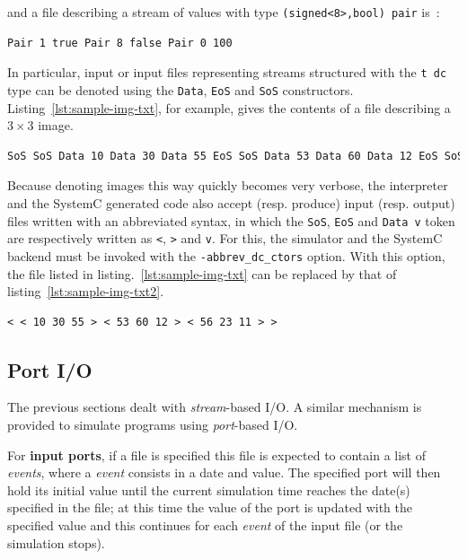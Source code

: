 \noindent
and  a file describing a stream of values with type \verb|(signed<8>,bool) pair| is~:

\begin{verbatim}
Pair 1 true Pair 8 false Pair 0 100
\end{verbatim}

In particular, input or input files representing streams structured with the \verb|t dc| type can be
denoted using the \verb|Data|, \verb|EoS| and \verb|SoS|
constructors. Listing~\ref{lst:sample-img-txt}, for example, gives the contents of a file describing
a $3 \times 3$ image.

\begin{lstlisting}[language=make,basicstyle=\footnotesize,frame=single,caption={A text input file
    describing a 3x3 image},label={lst:sample-img-txt}]
SoS SoS Data 10 Data 30 Data 55 EoS SoS Data 53 Data 60 Data 12 EoS SoS Data 56 Data 23 Data 11 EoS EoS
\end{lstlisting}

Because denoting images this way quickly becomes very verbose, the interpreter and the SystemC
generated code also accept (resp. produce) input (resp. output) files written with an
abbreviated syntax, in which the \verb|SoS|, \verb|EoS| and \verb|Data v| token are respectively
written as \verb|<|, \verb|>| and \verb|v|. For this, the simulator and the SystemC backend
must be invoked with the \verb|-abbrev_dc_ctors| option. With this option, the file listed in
listing.~\ref{lst:sample-img-txt} can be replaced by that of listing~\ref{lst:sample-img-txt2}.

\begin{lstlisting}[language=make,basicstyle=\footnotesize,frame=single,caption={A text input file
    describing a 3x3 image (abbreviated syntax)},label={lst:sample-img-txt2}]
< < 10 30 55 > < 53 60 12 > < 56 23 11 > >
\end{lstlisting}

\subsection{Port I/O}
\label{sec:asynchronous-io}

The previous sections dealt with \emph{stream}-based I/O. A similar mechanism is provided to
simulate programs using \emph{port}-based I/O. 

\medskip
For \textbf{input ports}, if a file is specified this file is expected to contain a list of \emph{events},
where a \emph{event} consists in a date and value. The specified port will then hold its initial
value until the current simulation time reaches the date(s) specified in the file; at this time the
value of the port is updated with the specified value and this continues for each \emph{event} of
the input file (or the simulation stops). 

